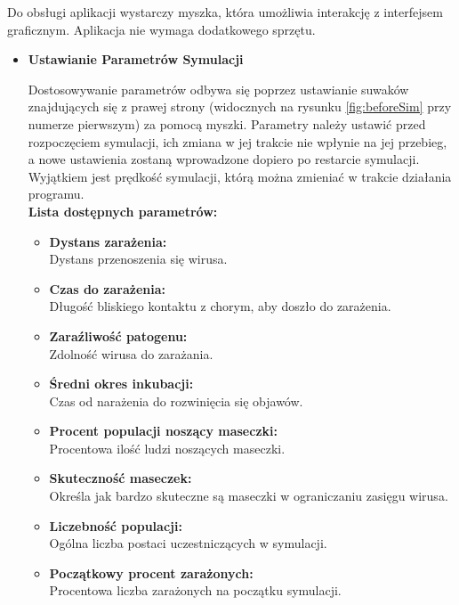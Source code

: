 Do obsługi aplikacji wystarczy myszka, która umożliwia interakcję z interfejsem graficznym. Aplikacja nie wymaga dodatkowego sprzętu.
\begin{itemize}
	\item \textbf{Ustawianie Parametrów Symulacji}
	
	Dostosowywanie parametrów odbywa się poprzez ustawianie suwaków znajdujących się z prawej strony (widocznych na rysunku \ref{fig:beforeSim} przy numerze pierwszym) za pomocą myszki. Parametry należy ustawić przed rozpoczęciem symulacji, ich zmiana w jej trakcie nie wpłynie na jej przebieg, a nowe ustawienia zostaną wprowadzone dopiero po restarcie symulacji. Wyjątkiem jest prędkość symulacji, którą można zmieniać w trakcie działania programu.\\
	\textbf{Lista dostępnych parametrów:}
	\begin{itemize}
		\item \textbf{Dystans zarażenia:}\\
		 Dystans przenoszenia się wirusa.
		
		\item \textbf{Czas do zarażenia:}\\
		 Długość bliskiego kontaktu z chorym, aby doszło do zarażenia.

		\item \textbf{Zaraźliwość patogenu:}\\
		 Zdolność wirusa do zarażania.
		
		\item \textbf{Średni okres inkubacji:}\\
		Czas od narażenia do rozwinięcia się objawów.

		\item \textbf{Procent populacji noszący maseczki:}\\
		Procentowa ilość ludzi noszących maseczki.

		\item \textbf{Skuteczność maseczek:}\\
		Określa jak bardzo skuteczne są maseczki w ograniczaniu zasięgu wirusa.
		
		\item \textbf{Liczebność populacji:}\\
		Ogólna liczba postaci uczestniczących w symulacji.
		
		\item \textbf{Początkowy procent zarażonych:}\\
		Procentowa liczba zarażonych na początku symulacji.
		

\end{itemize}
\end{itemize}
